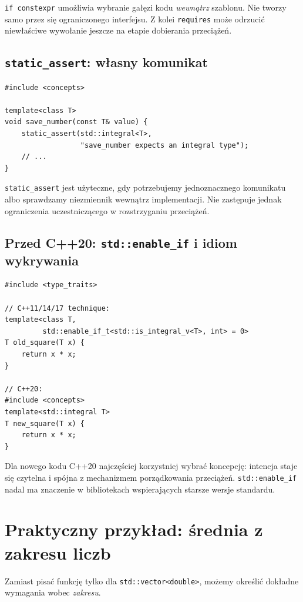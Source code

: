 \texttt{if constexpr} umożliwia wybranie gałęzi kodu
\emph{wewnątrz} szablonu. Nie tworzy samo przez się
ograniczonego interfejsu. Z kolei \texttt{requires}
może odrzucić niewłaściwe wywołanie jeszcze na etapie
dobierania przeciążeń.

\subsection{\texttt{static\_assert}: własny komunikat}

\begin{lstlisting}
#include <concepts>

template<class T>
void save_number(const T& value) {
    static_assert(std::integral<T>,
                  "save_number expects an integral type");
    // ...
}
\end{lstlisting}

\texttt{static\_assert} jest użyteczne, gdy potrzebujemy
jednoznacznego komunikatu albo sprawdzamy niezmiennik wewnątrz
implementacji. Nie zastępuje jednak ograniczenia uczestniczącego
w rozstrzyganiu przeciążeń.

\subsection{Przed C++20: \texttt{std::enable\_if} i idiom wykrywania}

\begin{lstlisting}
#include <type_traits>

// C++11/14/17 technique:
template<class T,
         std::enable_if_t<std::is_integral_v<T>, int> = 0>
T old_square(T x) {
    return x * x;
}

// C++20:
#include <concepts>
template<std::integral T>
T new_square(T x) {
    return x * x;
}
\end{lstlisting}

Dla nowego kodu C++20 najczęściej korzystniej wybrać
koncepcję: intencja staje się czytelna i spójna z mechanizmem
porządkowania przeciążeń. \texttt{std::enable\_if}
nadal ma znaczenie w bibliotekach wspierających starsze
wersje standardu.

\section{Praktyczny przykład: średnia z zakresu liczb}
\label{sec:concepts-praktyka}

Zamiast pisać funkcję tylko dla \texttt{std::vector<double>},
możemy określić dokładne wymagania wobec \emph{zakresu}.

